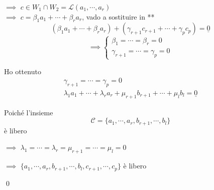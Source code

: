 {\begin{enumerate}
    $\implies$ $c \in W_1 \cap W_2 = \mathscr{L}(a_1,\cdots, a_r)$ \\
    
    $\implies$ $c = \beta_1 a_1 +\cdots+\beta_r a_r$, vado a sostituire in **
    \[(\beta_1 a_1 +\cdots+\beta_r a_r)+(\gamma_{r+1} c_{r+1} + \cdots + \gamma_p c_p) = \underline{0}\]
    \[\implies \begin{cases}
    	\beta_1=\cdots=\beta_r=0\\
    	\gamma_{r+1}=\cdots=\gamma_p=0
    \end{cases}\]	%

    Ho ottenuto
    \begin{gather*}
    \gamma_{r+1}=\cdots=\gamma_p=0\\
    \lambda_1a_1+ \cdots + \lambda_r a_r + \mu_{r+1} b_{r+1} + \cdots + \mu_l b_l=\underline{0}
    \end{gather*}
     
    Poiché l'insieme \[\mathscr{C}=\{a_1, \cdots, a_r, b_{r+1}, \cdots, b_l\}\] è libero
    
    $\implies$ $\lambda_1=\cdots=\lambda_r = \mu_{r+1}=\cdots=\mu_l=0$
    
    $\implies$ $\{a_1, \cdots, a_r, b_{r+1}, \cdots, b_l, c_{r+1}, \cdots, c_p\}$ è libero
\end{enumerate}\qed}

